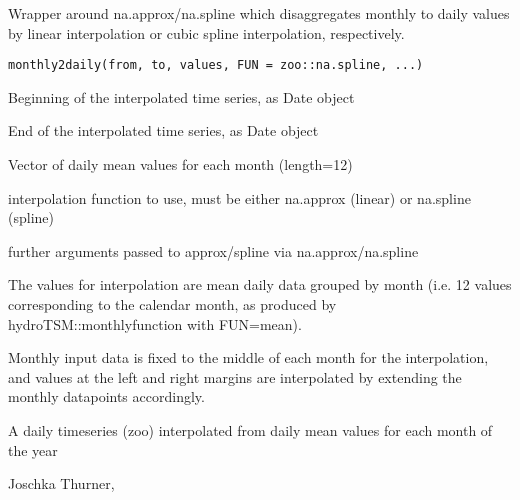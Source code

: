 %
\begin{Description}\relax
Wrapper around na.approx/na.spline which disaggregates monthly to daily values
by linear interpolation or cubic spline interpolation, respectively.
\end{Description}
%
\begin{Usage}
\begin{verbatim}
monthly2daily(from, to, values, FUN = zoo::na.spline, ...)
\end{verbatim}
\end{Usage}
%
\begin{Arguments}
\begin{ldescription}
\item[\code{from}] Beginning of the interpolated time series, as Date object

\item[\code{to}] End of the interpolated time series, as Date object

\item[\code{values}] Vector of daily mean values for each month (length=12)

\item[\code{FUN}] interpolation function to use, must be either na.approx (linear) or na.spline (spline)

\item[\code{...}] further arguments passed to approx/spline via na.approx/na.spline
\end{ldescription}
\end{Arguments}
%
\begin{Details}\relax
The values for interpolation are mean daily data grouped by month (i.e. 12 values corresponding to
the calendar month, as produced by hydroTSM::monthlyfunction with FUN=mean).

Monthly input data is fixed to the middle of each month for the interpolation, and values at
the left and right margins are interpolated by extending the monthly datapoints accordingly.
\end{Details}
%
\begin{Value}
A daily timeseries (zoo) interpolated from daily mean values for each month of the year
\end{Value}
%
\begin{Author}\relax
Joschka Thurner, 
\end{Author}
%
